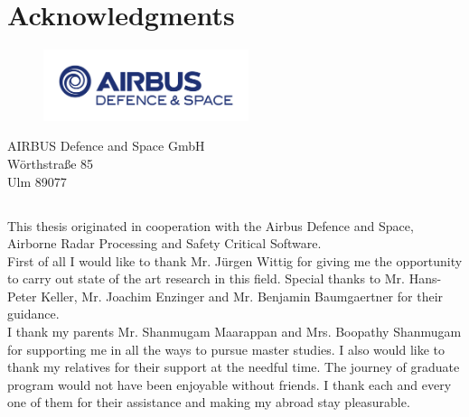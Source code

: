 \chapter*{Acknowledgments}
\label{chap:ack}

\begin{center}

	\begin{figure}[h!]
	\centering
	\includegraphics[width=60mm]{figures/AIRBUS_DS_Flat_RGB}
	\end{figure}
	
	AIRBUS Defence and Space GmbH\\
	W{\"o}rthstra{\ss}e 85 \\
	Ulm 89077 \\

\end{center}

\section*{}
This thesis originated in cooperation with the Airbus Defence and Space, Airborne Radar Processing and Safety Critical Software. \\

First of all I would like to thank Mr. J{\"u}rgen Wittig for giving me the opportunity to carry out state of the art research in this field. Special thanks to Mr. Hans-Peter Keller, Mr. Joachim Enzinger and Mr. Benjamin Baumgaertner for their guidance. \\

I thank my parents Mr. Shanmugam Maarappan and Mrs. Boopathy Shanmugam for supporting me in all the ways to pursue master studies. I also would like to thank my relatives for their support at the needful time. The journey of graduate program would not have been enjoyable without friends. I thank each and every one of them for their assistance and making my abroad stay pleasurable.